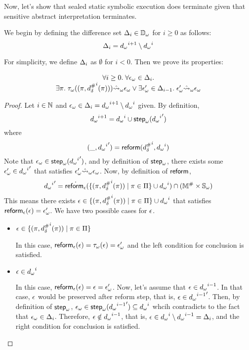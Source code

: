 Now, let's show that sealed static symbolic execution does terminate
given that sensitive abstract interpretation terminates.

We begin by defining the difference set $\Delta_i \in {\mathbb{D}}_\omega$ for $i \geq 0$ as follows:
\[
  \Delta_i = {{d}_\omega}^{i+1} \setminus {{d}_\omega}^i
\]

For simplicity, we define $\Delta_i$ as $\emptyset$ for $i < 0$.
Then we prove its properties:
\begin{lemma}\label{lemma:diffset_prop}
  \[
    \begin{array}{c}
      \forall i \geq 0. \; \forall {\epsilon}_\omega \in \Delta_i. \\
      \exists \pi. \; {\tau}_\omega((\pi,{{d}^{\#}_\delta}^i(\pi))) \hat{\leadsto}_\omega {\epsilon}_\omega 
      \lor \exists {\epsilon}_\omega' \in \Delta_{i-1} . \; {\epsilon}_\omega' \hat{\leadsto}_\omega {\epsilon}_\omega
    \end{array}
  \]
\end{lemma}
\begin{proof}
  Let $i \in \mathbb{N}$ and ${\epsilon}_\omega \in \Delta_i = {{d}_\omega}^{i+1} \setminus {{d}_\omega}^i$ given.
  By definition,
  \[
    {{d}_\omega}^{i+1} = {{d}_\omega}^i \cup {\textsf{step}}_\omega({{{d}_\omega}^i}')
  \]
  where
  \[
    (\_, {{{d}_\omega}^i}') = \textsf{reform}({{d}^{\#}_\delta}^i, {{d}_\omega}^i)
  \]
  Note that ${\epsilon}_\omega \in {\textsf{step}}_\omega({{{d}_\omega}^i}')$,
  and by definition of ${\textsf{step}}_\omega$, there exists some
  ${\epsilon}_\omega' \in {{{d}_\omega}^i}'$ that satisfies ${\epsilon}_\omega' \hat{\leadsto}_\omega {\epsilon}_\omega$.
  Now, by definition of $\textsf{reform}$,
  \[
    {{{d}_\omega}^i}' =
    \dot{\textsf{reform}_\epsilon}(\{ (\pi, {{d}^{\#}_\delta}^i(\pi)) \mid \pi \in \Pi \} \cup {{d}_\omega}^i)
    \cap ({\mathbb{M}}^{\#} \times {\mathbb{S}}_\omega)
  \]
  This means there exists
  $\epsilon \in \{ (\pi, {{d}^{\#}_\delta}^i(\pi)) \mid \pi \in \Pi \} \cup {{d}_\omega}^i$
  that satisfies $\textsf{reform}_\epsilon(\epsilon) = {\epsilon}_\omega'$. We have two possible cases for $\epsilon$.
  \begin{itemize}
 
  \item $\epsilon \in \{ (\pi, {{d}^{\#}_\delta}^i(\pi)) \mid \pi \in \Pi \}$

  In this case, $\textsf{reform}_\epsilon(\epsilon) = {\tau}_\omega(\epsilon) = {\epsilon}_\omega'$
  and the left condition for conclusion is satisfied.
  
  \item $\epsilon \in {{d}_\omega}^i$

  In this case, $\textsf{reform}_\epsilon(\epsilon) = \epsilon = {\epsilon}_\omega'$.
  Now, let's assume that $\epsilon \in {{d}_\omega}^{i-1}$.
  In that case, $\epsilon$ would be preserved after reform step, that is,
  $\epsilon \in {{{d}_\omega}^{i-1}}'$. Then, by definition of ${\textsf{step}}_\omega$,
  ${\epsilon}_\omega \in {\textsf{step}}_\omega({{{d}_\omega}^{i-1}}') \subseteq {{d}_\omega}^i$
  whcih contradicts to the fact that ${\epsilon}_\omega \in \Delta_i$.
  Therefore, $\epsilon \notin {{d}_\omega}^{i-1}$, that is,
  $\epsilon \in {{d}_\omega}^i \setminus {{d}_\omega}^{i-1} = \Delta_i$,
  and the right condition for conclusion is satisfied.
  \end{itemize}
\end{proof}

